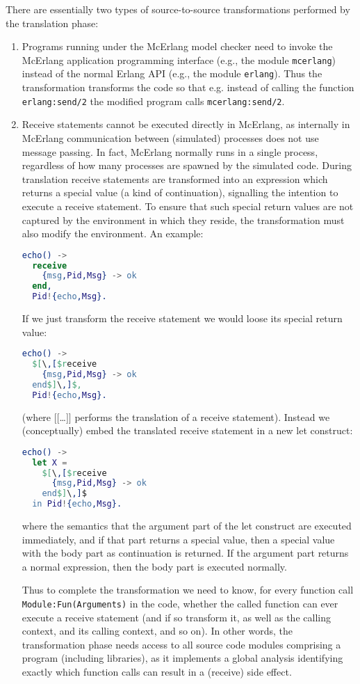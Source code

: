 \documentclass[a4paper]{article}
\begin{document}
There are essentially two types of source-to-source transformations
performed by the translation phase:
\begin{enumerate}
\item
Programs running under the McErlang model checker need to invoke
the McErlang application programming interface 
(e.g., the module \lstinline{mcerlang}) 
instead of the normal Erlang API (e.g., the module \lstinline{erlang}).
Thus the transformation transforms the code so that e.g. instead
of calling the function \lstinline{erlang:send/2} the modified
program calls \lstinline{mcerlang:send/2}.
\item
Receive statements cannot be executed directly in McErlang,
as internally in McErlang communication between (simulated)
processes does not use message passing. In fact, McErlang normally
runs in a single process, regardless of how many processes are
spawned by the simulated code. During translation
receive statements are transformed into an expression
which returns a special value (a kind of continuation),
signalling the intention to execute a receive statement. 
To ensure that such special return
values are not captured by the environment in which they reside,
the transformation must also modify the environment.
An example: 
\begin{lstlisting}[language=Erlang]
echo() ->
  receive
    {msg,Pid,Msg} -> ok
  end,
  Pid!{echo,Msg}.
\end{lstlisting}
If we just transform the receive statement we would loose
its special return value:
\begin{lstlisting}[language=Erlang,mathescape]
echo() ->
  $[\,[$receive
    {msg,Pid,Msg} -> ok
  end$]\,]$,
  Pid!{echo,Msg}.
\end{lstlisting}
(where $[[$\ldots$]]$ performs the translation
of a receive statement).
Instead we (conceptually)
embed the translated receive statement in a new let construct:
\begin{lstlisting}[language=Erlang,mathescape]
echo() ->
  let X =
    $[\,[$receive
      {msg,Pid,Msg} -> ok
    end$]\,]$
  in Pid!{echo,Msg}.
\end{lstlisting}
where the semantics that the argument part of the let construct
are executed immediately, and if that part returns a special value,
then a special value with the body part as continuation is returned.
If the argument part returns a normal expression, then the body
part is executed normally.

Thus to complete the transformation we need to know, 
for every function call \lstinline{Module:Fun(Arguments)}
in the code, whether the called function can ever execute a receive statement 
(and if so transform it, as well as the calling context, and its
calling context, and so on). 
In other words, the transformation phase needs access to all source
code modules comprising a program (including libraries),
as it implements a global analysis identifying exactly 
which function calls can result in a (receive) side effect.
\end{enumerate}
\end{document}
